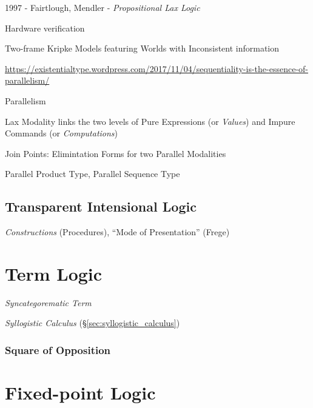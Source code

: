 1997 - Fairtlough, Mendler - \emph{Propositional Lax Logic}

Hardware verification

Two-frame Kripke Models featuring Worlds with Inconsistent information

\url{https://existentialtype.wordpress.com/2017/11/04/sequentiality-is-the-essence-of-parallelism/}

Parallelism

Lax Modality links the two levels of Pure Expressions (or \emph{Values}) and
Impure Commands (or \emph{Computations})

Join Points: Elimintation Forms for two Parallel Modalities

Parallel Product Type, Parallel Sequence Type



\subsection{Transparent Intensional Logic}
\label{sec:transparent_intensional_logic}

\emph{Constructions} (Procedures), ``Mode of Presentation'' (Frege)



\section{Term Logic}\label{sec:term_logic}

\emph{Syncategorematic Term}

\emph{Syllogistic Calculus} (\S\ref{sec:syllogistic_calculus})



\subsubsection{Square of Opposition}\label{sec:square_of_opposition}



\section{Fixed-point Logic}\label{sec:fixedpoint_logic}

